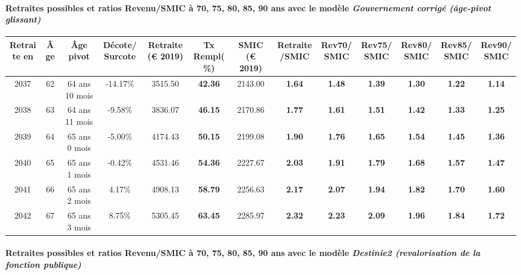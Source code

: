 \paragraph{Retraites possibles et ratios Revenu/SMIC à 70, 75, 80, 85, 90 ans avec le modèle \emph{Gouvernement corrigé (âge-pivot glissant)}}  
 
{ \scriptsize \begin{center} 
\begin{tabular}[htb]{|c|c||c|c||c|c||c||c|c|c|c|c|c|} 
\hline 
 Retraite en &  Âge &  Âge pivot &  Décote/Surcote &  Retraite (\euro{} 2019) &  Tx Rempl(\%) &  SMIC (\euro{} 2019) &  Retraite/SMIC &  Rev70/SMIC &  Rev75/SMIC &  Rev80/SMIC &  Rev85/SMIC &  Rev90/SMIC \\ 
\hline \hline 
 2037 &  62 &  64 ans 10 mois &  -14.17\% &  3515.50 &  {\bf 42.36} &  2143.00 &  {\bf 1.64} &  {\bf 1.48} &  {\bf 1.39} &  {\bf 1.30} &  {\bf 1.22} &  {\bf 1.14} \\ 
\hline 
 2038 &  63 &  64 ans 11 mois &  -9.58\% &  3836.07 &  {\bf 46.15} &  2170.86 &  {\bf 1.77} &  {\bf 1.61} &  {\bf 1.51} &  {\bf 1.42} &  {\bf 1.33} &  {\bf 1.25} \\ 
\hline 
 2039 &  64 &  65 ans 0 mois &  -5.00\% &  4174.43 &  {\bf 50.15} &  2199.08 &  {\bf 1.90} &  {\bf 1.76} &  {\bf 1.65} &  {\bf 1.54} &  {\bf 1.45} &  {\bf 1.36} \\ 
\hline 
 2040 &  65 &  65 ans 1 mois &  -0.42\% &  4531.46 &  {\bf 54.36} &  2227.67 &  {\bf 2.03} &  {\bf 1.91} &  {\bf 1.79} &  {\bf 1.68} &  {\bf 1.57} &  {\bf 1.47} \\ 
\hline 
 2041 &  66 &  65 ans 2 mois &  4.17\% &  4908.13 &  {\bf 58.79} &  2256.63 &  {\bf 2.17} &  {\bf 2.07} &  {\bf 1.94} &  {\bf 1.82} &  {\bf 1.70} &  {\bf 1.60} \\ 
\hline 
 2042 &  67 &  65 ans 3 mois &  8.75\% &  5305.45 &  {\bf 63.45} &  2285.97 &  {\bf 2.32} &  {\bf 2.23} &  {\bf 2.09} &  {\bf 1.96} &  {\bf 1.84} &  {\bf 1.72} \\ 
\hline 
\hline 
\end{tabular} 
\end{center} } 
\paragraph{Retraites possibles et ratios Revenu/SMIC à 70, 75, 80, 85, 90 ans avec le modèle \emph{Destinie2 (revalorisation de la fonction publique)}}  
 
